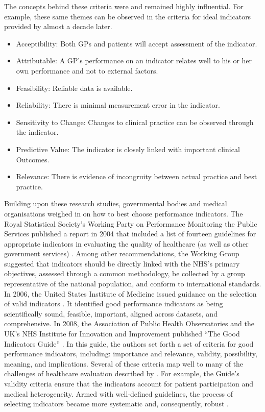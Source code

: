 \documentclass[12pt]{article}
\begin{document}
The concepts behind these criteria were and remained highly influential. For example, these same themes can be observed in the criteria for ideal indicators provided by \citet{campbellDevelopingIndicatorsConcept2010} almost a decade later.

\begin{itemize}
  \item Acceptibility: Both GPs and patients will accept assessment of the indicator.
  \item Attributable: A GP's performance on an indicator relates well to his or her own performance and not to external factors.
  \item Feasibility: Reliable data is available.
  \item Reliability: There is minimal measurement error in the indicator.
  \item Sensitivity to Change: Changes to clinical practice can be observed through the indicator.
  \item Predictive Value: The indicator is closely linked with important clinical Outcomes.
  \item Relevance: There is evidence of incongruity between actual practice and best practice.
\end{itemize}


Building upon these research studies, governmental bodies and medical organisations weighed in on how to best choose performance indicators. The Royal Statistical Society's Working Party on Performance Monitoring the Public Services published a report in 2004 that included a list of fourteen guidelines for appropriate indicators in evaluating the quality of healthcare (as well as other government services) \citep{birdPerformanceIndicatorsGood2005}. Among other recommendations, the Working Group suggested that indicators should be directly linked with the NHS's primary objectives, assessed through a common methodology, be collected by a group representative of the national population, and conform to international standards. In 2006, the United States Institute of Medicine issued guidance on the selection of valid indicators \citep{instituteofmedicinePerformanceMeasurementAccelerating2006}. It identified good performance indicators as being scientifically sound, feasible, important, aligned across datasets, and comprehensive. In 2008, the Association of Public Health Observatories and the UK's NHS Institute for Innovation and Improvement published ``The Good Indicators Guide'' \citep{pencheonGoodIndicatorsGuide2007}. In this guide, the authors set forth a set of criteria for good performance indicators, including: importance and relevance, validity, possibility, meaning, and implications. Several of these criteria map well to many of the challenges of healthcare evaluation described by \citet{ozcanQuantitativeMethodsHealth2005}. For example, the Guide's validity criteria ensure that the indicators account for patient participation and medical heterogeneity. Armed with well-defined guidelines, the process of selecting indicators became more systematic and, consequently, robust \citep{boulkedidUsingReportingDelphi2011}.
\end{document}
